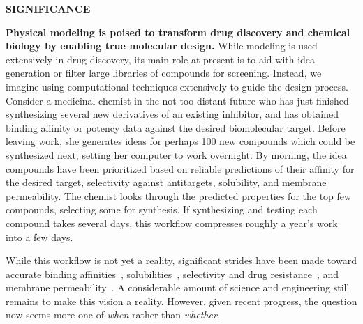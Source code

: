 \documentclass[11pt]{article}
\begin{document}




{\Large \bf SIGNIFICANCE}


\textbf{Physical modeling is poised to transform drug discovery and chemical biology by enabling true molecular design.}
While modeling is used extensively in drug discovery, its main role at present is to aid with idea generation or filter large libraries of compounds for screening. 
Instead, we imagine using computational techniques extensively to guide the design process. 
Consider a medicinal chemist in the not-too-distant future who has just finished synthesizing several new derivatives of an existing inhibitor, and has obtained binding affinity or potency data against the desired biomolecular target. 
Before leaving work, she generates ideas for perhaps 100 new compounds which could be synthesized next, setting her computer to work overnight. 
By morning, the idea compounds have been prioritized based on reliable predictions of their affinity for the desired target, selectivity against antitargets, solubility, and membrane permeability.  
The chemist looks through the predicted properties for the top few compounds, selecting some for synthesis. 
If synthesizing and testing each compound takes several days, this workflow compresses roughly a year's work into a few days.

While this workflow is not yet a reality, significant strides have been made toward accurate binding affinities~\cite{mobley_perspective_2012, christ_accuracy_2014, deng_distinguishing_2015, Sherborne:2016:JComputAidedMolDes, schrodinger_accurate_2015, christ_binding_2016, cui_affinity_2016, verras_free_2016, Aldeghi:2017:J.Am.Chem.Soc.}, solubilities~\cite{Schnieders:2012:J.Chem.TheoryComput., park_absolute_2014, liu_using_2016}, selectivity and drug resistance~\cite{leonis_contribution_2013, Aldeghi:2017:J.Am.Chem.Soc.}, and membrane permeability~\cite{lee_permeability_2016, comer_permeability_2014}. 
A considerable amount of science and engineering still remains to make this vision a reality.
However, given recent progress, the question now seems more one of \emph{when} rather than \emph{whether}.
\end{document}
